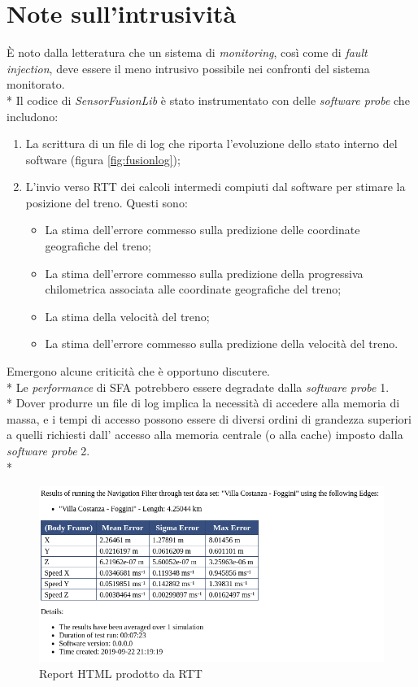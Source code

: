 \section{Note sull'intrusivit\`a}
\`E noto dalla letteratura che un sistema di \emph{monitoring}, cos\`i come di \emph{fault injection}, deve essere il meno intrusivo possibile nei confronti del sistema monitorato.\\*
Il codice di \emph{SensorFusionLib} \`e stato instrumentato con delle \emph{software probe} che includono:
\begin{enumerate}
	\item La scrittura di un file di log che riporta l'evoluzione dello stato interno del software (figura \ref{fig:fusionlog});
	\item L'invio verso RTT dei calcoli intermedi compiuti dal software per stimare la posizione del treno. Questi sono:
	\begin{itemize}
		\item La stima dell'errore commesso sulla predizione delle coordinate geografiche del treno;
		\item La stima dell'errore commesso sulla predizione della progressiva chilometrica associata alle coordinate geografiche del treno;
		\item La stima della velocit\`a del treno;
		\item La stima dell'errore commesso sulla predizione della velocit\`a del treno.
	\end{itemize}
\end{enumerate}
Emergono alcune criticit\`a che \`e opportuno discutere.\\*
Le \emph{performance} di SFA potrebbero essere degradate dalla \emph{software probe} 1.\\*
Dover produrre un file di log implica la necessit\`a di accedere alla memoria di massa, e i tempi di accesso
possono essere di diversi ordini di grandezza superiori a quelli richiesti dall' accesso alla memoria centrale (o alla cache) imposto dalla \emph{software probe} 2.\\*
\begin{figure}[h]
	\centering
	\includegraphics[width=0.7\linewidth]{img/rttreport}
	\caption{Report HTML prodotto da RTT}
	\label{fig:rttreport}
\end{figure}

